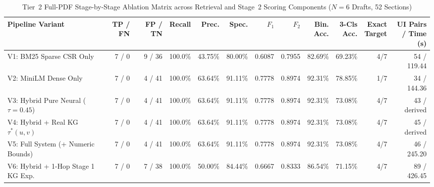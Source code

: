 \begin{landscape}
\begin{table}[p]
    \centering
    \scriptsize
    \setlength{\tabcolsep}{3.0pt}
    \renewcommand{\arraystretch}{0.90}
    \caption[Tier 2 Full Stage-by-Stage Ablation Comparison]{Tier~2 Full-PDF Stage-by-Stage Ablation Matrix across Retrieval and Stage~2 Scoring Components ($N = 6$ Drafts, 52 Sections)}
    \label{tab:app_tier2_ablation_full}
    \begin{tabular*}{\linewidth}{@{}l@{\extracolsep{\fill}}rrrrrrrrrrr@{}}
        \toprule
        \textbf{Pipeline Variant} & \textbf{TP / FN} & \textbf{FP / TN} & \textbf{Recall} & \textbf{Prec.} & \textbf{Spec.} & \textbf{$F_1$} & \textbf{$F_2$} & \shortstack[r]{\textbf{Bin.}\\\textbf{Acc.}} & \shortstack[r]{\textbf{3-Cls}\\\textbf{Acc.}} & \shortstack[r]{\textbf{Exact}\\\textbf{Target}} & \shortstack[r]{\textbf{UI Pairs}\\\textbf{/ Time (s)}} \\
        \midrule
        V1: BM25 Sparse CSR Only & 7 / 0 & 9 / 36 & 100.0\% & 43.75\% & 80.00\% & 0.6087 & 0.7955 & 82.69\% & 69.23\% & 4/7 & 54 / 119.44 \\
        V2: MiniLM Dense Only & 7 / 0 & 4 / 41 & 100.0\% & 63.64\% & 91.11\% & 0.7778 & 0.8974 & 92.31\% & 78.85\% & 1/7 & 34 / 144.36 \\
        V3: Hybrid Pure Neural ($\tau = 0.45$) & 7 / 0 & 4 / 41 & 100.0\% & 63.64\% & 91.11\% & 0.7778 & 0.8974 & 92.31\% & 73.08\% & 4/7 & 43 / derived \\
        V4: Hybrid + Real KG $\tau^*(u,v)$ & 7 / 0 & 4 / 41 & 100.0\% & 63.64\% & 91.11\% & 0.7778 & 0.8974 & 92.31\% & 73.08\% & 4/7 & 45 / derived \\
        V5: Full System (+ Numeric Bounds) & 7 / 0 & 4 / 41 & 100.0\% & 63.64\% & 91.11\% & 0.7778 & 0.8974 & 92.31\% & 73.08\% & 4/7 & 46 / 245.20 \\
        V6: Hybrid + 1-Hop Stage 1 KG Exp. & 7 / 0 & 7 / 38 & 100.0\% & 50.00\% & 84.44\% & 0.6667 & 0.8333 & 86.54\% & 71.15\% & 4/7 & 89 / 426.45 \\
        \bottomrule
    \end{tabular*}
\end{table}


\end{landscape}

